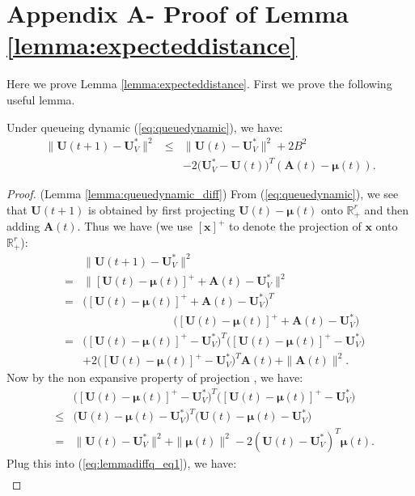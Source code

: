 \documentclass[journal]{IEEEtran}
\newcommand{\bv}[1]{{\boldsymbol{#1} }}
\begin{document}
\section*{Appendix A- Proof of Lemma \ref{lemma:expecteddistance}}
Here we prove Lemma \ref{lemma:expecteddistance}. First we prove the following useful lemma. 
\begin{lemma}\label{lemma:queuedynamic_diff}
Under queueing dynamic (\ref{eq:queuedynamic}), we have: 
\begin{eqnarray*}
\|\bv{U}(t+1)-\bv{U}^*_V\|^2&\leq& \|\bv{U}(t)-\bv{U}^*_V\|^2+2B^2\\
&&- 2\big(\bv{U}^*_V-\bv{U}(t)\big)^T(\bv{A}(t)-\bv{\mu}(t)).
\end{eqnarray*}
\end{lemma}
\begin{proof} (Lemma \ref{lemma:queuedynamic_diff})
From (\ref{eq:queuedynamic}), we see that $\bv{U}(t+1)$ is obtained by first projecting $\bv{U}(t)-\bv{\mu}(t)$ onto $\mathbb{R}^r_+$ and then adding $\bv{A}(t)$. Thus we have (we use $[\bv{x}]^+$ to denote the projection of $\bv{x}$ onto $\mathbb{R}^r_+$): 
\begin{eqnarray}
&&\|\bv{U}(t+1)-\bv{U}^*_V\|^2\nonumber\\
&=&\|[\bv{U}(t)-\bv{\mu}(t)]^++\bv{A}(t)-\bv{U}^*_V\|^2\nonumber\\
&=&\big([\bv{U}(t)-\bv{\mu}(t)]^++\bv{A}(t)-\bv{U}^*_V\big)^T\nonumber\\
&&\qquad\qquad\qquad\qquad\big([\bv{U}(t)-\bv{\mu}(t)]^++\bv{A}(t)-\bv{U}^*_V\big)\nonumber\\
&=&\big([\bv{U}(t)-\bv{\mu}(t)]^+-\bv{U}^*_V\big)^T\big([\bv{U}(t)-\bv{\mu}(t)]^+-\bv{U}^*_V\big)\nonumber\\
&& + 2\big([\bv{U}(t)-\bv{\mu}(t)]^+-\bv{U}^*_V\big)^T\bv{A}(t)+\|\bv{A}(t)\|^2.\label{eq:lemmadiffq_eq1}
\end{eqnarray}
Now by the non expansive property of projection  \cite{bertsekasoptbook}, we have:
\begin{eqnarray*}
&&\big([\bv{U}(t)-\bv{\mu}(t)]^+-\bv{U}^*_V\big)^T\big([\bv{U}(t)-\bv{\mu}(t)]^+-\bv{U}^*_V\big)\\
&\leq& \big(\bv{U}(t)-\bv{\mu}(t)-\bv{U}^*_V\big)^T\big(\bv{U}(t)-\bv{\mu}(t)-\bv{U}^*_V\big)\\
&=&\|\bv{U}(t)-\bv{U}^*_V\|^2+\|\bv{\mu}(t)\|^2-2(\bv{U}(t)-\bv{U}^*_V)^T\bv{\mu}(t).
\end{eqnarray*}
Plug this into (\ref{eq:lemmadiffq_eq1}), we have:
\begin{eqnarray}

\end{eqnarray}
\end{proof}
\end{document}
